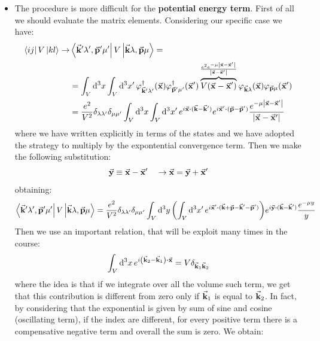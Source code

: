 \documentclass[../main/main.tex]{subfiles}
\begin{document}
\begin{itemize}
\item The procedure is more difficult for the \textbf{potential energy term}. First of all we should evaluate the matrix elements. Considering our specific case we have:
\begin{equation*}
\begin{split}
  \bra{ij} V \ket{kl} \rightarrow & \bra{\va{k}'\lambda ', \va{p}' \mu '} V \ket{\va{k} \lambda , \va{p} \mu }   = \\
  &=\int_{V}^{} \dd[3]{x} \int_{V}^{} \dd[3]{x'} \varphi _{\va{k}'\lambda ' } ^\dag (\va{x}) \varphi ^\dag_{\va{p}' \mu '} (\va{x}') \overbrace{V(\va{x}-\va{x}')}^{ \frac{e^2e^{-\mu \abs{\va{x}-\va{x}'} }}{\abs{\va{x}-\va{x}'} } }  \varphi _{\va{k}\lambda } (\va{x}) \varphi _{\va{p}\mu } (\va{x}')    \\
  &= \frac{e^2}{V^2} \delta _{\lambda \lambda '} \delta _{\mu \mu '} \int_{V}^{} \dd[3]{x} \int_{V}^{} \dd[3]{x'} e^{i \va{x} \vdot (\va{k}-\va{k}')}     e^{i \va{x}' \vdot (\va{p}-\va{p}')}   \frac{e^{-\mu \abs{\va{x}-\va{x}'} }}{\abs{\va{x}-\va{x}'} }
\end{split}
\end{equation*}
where we have written explicitly in terms of the states and we have adopted the strategy to multiply by the expontential convergence term.
Then we make the following substitution:
\begin{equation*}
  \va{y} \equiv \va{x} - \va{x}' \quad \rightarrow \va{x} = \va{y} + \va{x}'
\end{equation*}
obtaining:
\begin{equation*}
  \bra{\va{k}'\lambda ', \va{p}' \mu '} V \ket{\va{k} \lambda , \va{p} \mu }   = \frac{e^2}{V^2} \delta _{\lambda \lambda '} \delta _{\mu \mu '} \int_{V}^{} \dd[3]{y} \qty(\int_{V}^{} \dd[3]{x'} e^{i \va{x}'\vdot  (\va{k}+\va{p}-\va{k}'-\va{p}')}   )
  e^{i \va{y} \vdot (\va{k}-\va{k}') } \frac{e^{-\mu y}}{y}
\end{equation*}
Then we use an important relation, that will be exploit many times in the course:
\begin{equation}
  \int_{V}^{} \dd[3]{x} e^{i \qty(\va{k}_2 - \va{k}_1)\vdot \va{x} } = V \delta _{\va{k}_1 \va{k}_2}
\end{equation}
where the idea is that if we integrate over all the volume such term, we get that this contribution is different from zero only if \( \va{k}_1  \) is equal to \( \va{k}_2 \). In fact, by considering that the exponential is given by sum of sine and cosine (oscillating term), if the index are different, for every positive term there is a compensative negative term and overall the sum is zero. We obtain:

\end{itemize}
\end{document}
